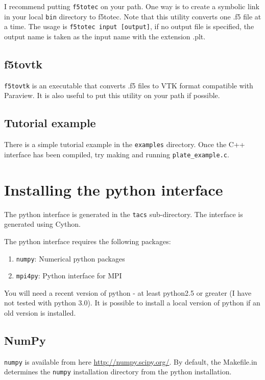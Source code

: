\documentclass{article}
\begin{document}
I recommend putting \texttt{f5totec} on your path. One way is
to create a symbolic link in your local \texttt{bin} directory to
f5totec. Note that this utility converts one .f5 file at a time. The
usage is \texttt{f5totec input [output]}, if no output file is
specified, the output name is taken as the input name with the
extension .plt.

\subsection{f5tovtk}

\texttt{f5tovtk} is an executable that converts .f5 files to 
VTK format compatible with Paraview. It is also useful to put this
utility on your path if possible.

\subsection{Tutorial example}

There is a simple tutorial example in the \texttt{examples}
directory. Once the C++ interface has been compiled, try making
and running \texttt{plate\_example.c}.

\section{Installing the python interface}

The python interface is generated in the \texttt{tacs} sub-directory.
The interface is generated using Cython.

The python interface requires the following packages:
%
\begin{enumerate}
\item \texttt{numpy}: Numerical python packages
\item \texttt{mpi4py}: Python interface for MPI
\end{enumerate}

You will need a recent version of python - at least python2.5 or
greater (I have not tested with python 3.0). It is possible to install
a local version of python if an old version is installed.

\subsection{NumPy}

\texttt{numpy} is available from here \url{http://numpy.scipy.org/}. By default,
the Makefile.in determines the \texttt{numpy} installation directory 
from the python installation.
\end{document}
